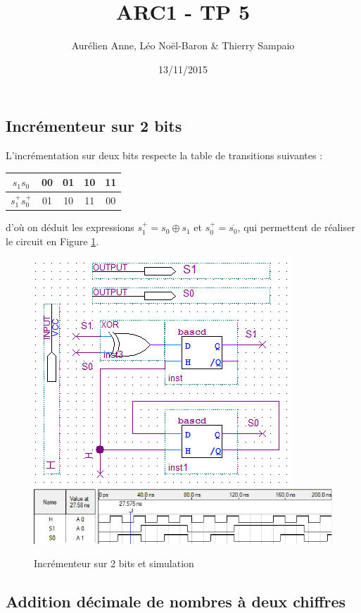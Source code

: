 \documentclass[a4paper,11pt]{article}
\title{ARC1 - TP 5}
\author{Aurélien Anne, Léo Noël-Baron \& Thierry Sampaio}
\date{13/11/2015}
\begin{document}
\maketitle

\subsection*{Incrémenteur sur 2 bits}

L'incrémentation sur deux bits respecte la table de transitions suivantes :
\begin{table}[h]\centering
\begin{tabular}{c|cccc}
$s_1s_0$ & 00 & 01 & 10 & 11 \\\hline
$s_1^+s_0^+$ & 01 & 10 & 11 & 00 \\
\end{tabular}\end{table}

d'où on déduit les expressions $s_1^+ = s_0\oplus s_1$ et $s_0^+ = \overline{s_0}$, qui permettent de réaliser le circuit en Figure \ref{inc3}.

\begin{figure}[h]
\center
\includegraphics[scale=0.6]{inc3.PNG}\vspace{1em}
\includegraphics[scale=0.6]{sim1.PNG}
\caption{Incrémenteur sur 2 bits et simulation}
\label{inc3}
\end{figure}


\subsection*{Addition décimale de nombres à deux chiffres}
\end{document}
